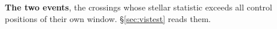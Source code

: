 \begin{table}
\centering
\caption{\textbf{The two events}, the crossings whose
stellar statistic exceeds all \NCtrl{} control positions of their own window.
\S\ref{sec:vistest} reads them.}
\label{tab:cand}
\footnotesize

\end{table}





